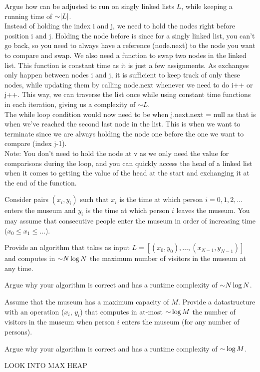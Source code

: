 \begin{problem}
\begin{questions}
    \item Argue how  can be adjusted to run on singly linked lists $L$, while keeping a running time of $\mathord{\sim}\lvert L \rvert$.\\
Instead of holding the index i and j, we need to hold the nodes right before position i and j. Holding the node before is since for a singly linked list, you can't go back, so you need to always have a reference (node.next) to the node you want to compare and swap. We also need a function to swap two nodes in the linked list. This function is constant time as it is just a few assignments. As exchanges only happen between nodes i and j, it is sufficient to keep track of only these nodes, while updating them by calling node.next whenever we need to do i++ or j++. This way, we can traverse the list once while using constant time functions in each iteration, giving us a complexity of $\sim L$.\\

The while loop condition would now need to be when j.next.next = null as that is when we've reached the second last node in the list. This is when we want to terminate since we are always holding the node one before the one we want to compare (index j-1).\\

Note: You don't need to hold the node at v as we only need the value for comparisons during the loop, and you can quickly access the head of a linked list when it comes to getting the value of the head at the start and exchanging it at the end of the function.
\end{questions}
\end{problem}

\begin{problem}
Consider pairs $(x_i, y_i)$ such that $x_i$ is the time at which person $i = 0, 1, 2 , \dots$ enters the museum and $y_i$ is the time at which person $i$ leaves the museum.  You may assume that consecutive people enter the museum in order of increasing time ($x_0 \leq x_1 \leq \dots$).
\begin{questions}
\item Provide an algorithm  that takes as input $L = [(x_0, y_0), \dots, (x_{N-1}, y_{N-1})]$ and computes in $\mathord{\sim}N \log N$ the maximum number of visitors in the museum at any time.
\item Argue why your algorithm  is correct and has a runtime complexity of $\mathord{\sim}N \log N$.
\item Assume that the museum has a maximum capacity of $M$. Provide a datastructure with an operation ($x_i$, $y_i$) that computes in at-most $\mathord{\sim}\log M$ the number of visitors in the museum when person $i$ enters the museum (for any number of persons).
\item Argue why your algorithm  is correct and has a runtime complexity of $\mathord{\sim}\log M$.

LOOK INTO MAX HEAP

\end{questions}

\end{problem}


\SUBMITMSG{}
\DEFAULTGRADING{}

